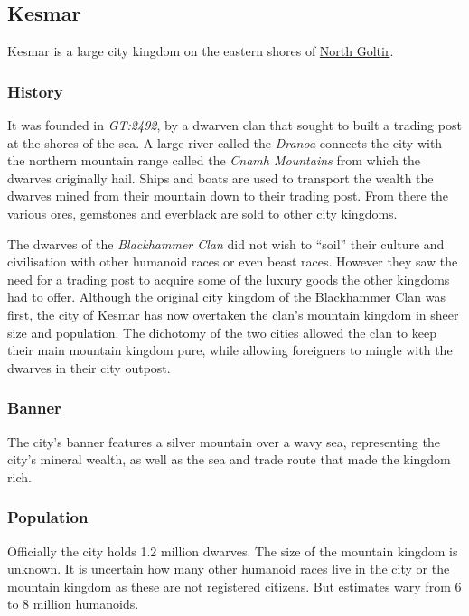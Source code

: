 \subsection{Kesmar}
\label{sec:Kesmar}

Kesmar is a large city kingdom on the eastern shores of
\hyperref[sec:Goltir]{North Goltir}.

\subsubsection{History}

It was founded in \emph{GT:2492}, by a dwarven clan that sought to built a
trading post at the shores of the sea. A large river called the \emph{Dranoa}
connects the city with the northern mountain range called the
\emph{Cnamh Mountains} from which the dwarves originally hail. Ships and
boats are used to transport the wealth the dwarves mined from their mountain
down to their trading post. From there the various ores, gemstones and everblack
are sold to other city kingdoms.

The dwarves of the \emph{Blackhammer Clan} did not wish to ``soil'' their
culture and civilisation with other humanoid races or even beast
races. However they saw the need for a trading post to acquire some of the
luxury goods the other kingdoms had to offer. Although the original city
kingdom of the Blackhammer Clan was first, the city of Kesmar has now
overtaken the clan's mountain kingdom in sheer size and population. The
dichotomy of the two cities allowed the clan to keep their main mountain
kingdom pure, while allowing foreigners to mingle with the dwarves in their
city outpost.

\subsubsection{Banner}

The city's banner features a silver mountain over a wavy sea, representing the
city's mineral wealth, as well as the sea and trade route that made the
kingdom rich.

\subsubsection{Population}

Officially the city holds 1.2 million dwarves. The size of the mountain
kingdom is unknown. It is uncertain how many other humanoid races live in
the city or the mountain kingdom as these are not registered citizens. But
estimates wary from 6 to 8 million humanoids.

